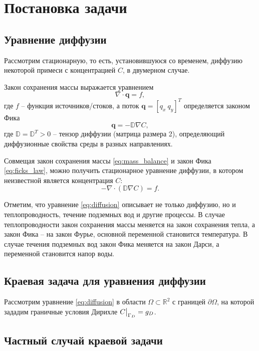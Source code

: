 \documentclass[a4paper, 11pt]{article}
\begin{document}
\section{Постановка задачи}

\subsection{Уравнение диффузии}

Рассмотрим стационарную, то есть, установившуюся со временем, диффузию некоторой примеси с концентрацией $C$, в двумерном случае.

Закон сохранения массы выражается уравнением 
\begin{equation}\label{eq:mass_balance}
\nabla \cdot \mathbf{q} = f,
\end{equation}
где $f$ -- функция источников/стоков, а поток $\mathbf{q} = [q_x~q_y]^T$ определяется законом Фика
\begin{equation}\label{eq:ficks_law}
\mathbf{q} = - \mathbb{D}\nabla C,
\end{equation}
где $\mathbb{D} = \mathbb{D}^T > 0$ -- тензор диффузии (матрица размера 2), определяющий диффузионные свойства среды в разных направлениях.

Совмещая закон сохранения массы \eqref{eq:mass_balance} и закон Фика \eqref{eq:ficks_law}, можно получить стационарное уравнение диффузии, в котором неизвестной является концентрация $C$:
\begin{equation}\label{eq:diffusion}
-\nabla\cdot \left(\mathbb{D}\nabla C\right) = f.
\end{equation}

Отметим, что уравнение \eqref{eq:diffusion} описывает не только диффузию, но и теплопроводность, течение подземных вод и другие процессы. В случае теплопроводности закон сохранения массы меняется на закон сохранения тепла, а закон Фика -- на закон Фурье, основной переменной становится температура. В случае течения подземных вод закон Фика меняется на закон Дарси, а переменной становится напор воды. 

\subsection{Краевая задача для уравнения диффузии}

Рассмотрим уравнение \eqref{eq:diffusion} в области $\Omega \subset \mathbb{R}^2$ с границей $\partial \Omega$, на которой зададим граничные условия Дирихле $C\big{|}_{\Gamma_D} = g_D$.
\subsection{Частный случай краевой задачи}
\end{document}
